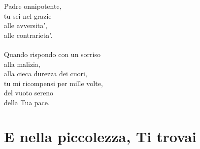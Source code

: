 \begin{haiku}
    Padre onnipotente,\\
    tu sei nel grazie\\
    alle avversita',\\
    alle contrarieta'.\\
    \leavevmode\\
    Quando rispondo con un sorriso\\
    alla malizia, \\
    alla cieca durezza dei cuori,\\
    tu mi ricompensi per mille volte,\\
    del vuoto sereno \\
    della Tua pace.\\
\end{haiku}

\pagebreak

\section{E nella piccolezza, Ti trovai}

\label{DioPadreOnnipotenteDef}


